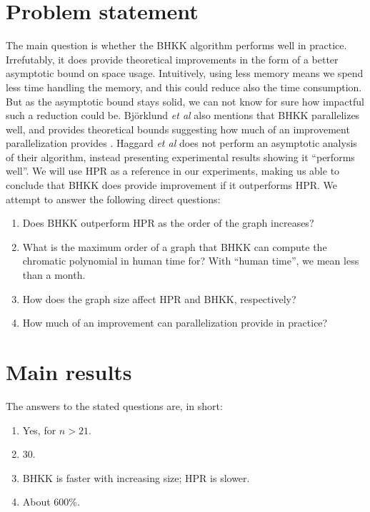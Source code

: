 \documentclass{cslthse-msc}
\begin{document}
\section{Problem statement}
The main question is whether the BHKK algorithm performs well in practice. Irrefutably, it does provide theoretical improvements in the form of a better asymptotic bound on space usage. Intuitively, using less memory means we spend less time handling the memory, and this could reduce also the time consumption. But as the asymptotic bound stays solid, we can not know for sure how impactful such a reduction could be. Björklund \emph{et al} also mentions that BHKK parallelizes well, and provides theoretical bounds suggesting how much of an improvement parallelization provides \cite[p.10]{cov_pack}. Haggard \emph{et al} does not perform an asymptotic analysis of their algorithm, instead presenting experimental results showing it ``performs well''. We will use HPR as a reference in our experiments, making us able to conclude that BHKK does provide improvement if it outperforms HPR. We attempt to answer the following direct questions:

\begin{enumerate}
 \item Does BHKK outperform HPR as the order of the graph increases? \label{ngrow}
 \item What is the maximum order of a graph that BHKK can compute the chromatic polynomial in human time for? \label{maxn}
 \subitem With ``human time'', we mean less than a month.
 \item How does the graph size affect HPR and BHKK, respectively? \label{mgrow}
 \item How much of an improvement can parallelization provide in practice? \label{parallel}
\end{enumerate}

\section{Main results}
The answers to the stated questions are, in short:

\begin{enumerate}
 \item Yes, for $n > 21$.
 \item 30.
 \item BHKK is faster with increasing size; HPR is slower.
 \item About 600\%.
\end{enumerate}
\end{document}
